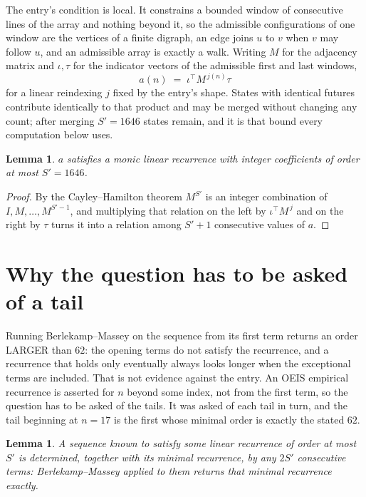 \documentclass[11pt,a4paper]{article}
\theoremstyle{plain}
\newtheorem{lemma}[theorem]{Lemma}
\theoremstyle{definition}
\begin{document}
The entry's condition is local. It constrains a bounded window of consecutive lines of the
array and nothing beyond it, so the admissible configurations of one window are the vertices of
a finite digraph, an edge joins $u$ to $v$ when $v$ may follow $u$, and an admissible array is
exactly a walk. Writing $M$ for the adjacency matrix and $\iota,\tau$ for the indicator vectors
of the admissible first and last windows,
\[
a(n)\;=\;\iota^{\!\top}M^{\,j(n)}\tau
\]
for a linear reindexing $j$ fixed by the entry's shape. States with identical futures
contribute identically to that product and may be merged without changing any count; after
merging $S'=1646$ states remain, and it is that bound every computation below uses.

\begin{lemma}\label{lem:cf}
$a$ satisfies a monic linear recurrence with integer coefficients of order at most $S'=1646$.
\end{lemma}

\begin{proof}
By the Cayley--Hamilton theorem $M^{S'}$ is an integer combination of $I,M,\dots,M^{S'-1}$,
and multiplying that relation on the left by $\iota^{\!\top}M^{\,j}$ and on the right by
$\tau$ turns it into a relation among $S'+1$ consecutive values of $a$.
\end{proof}

\section{Why the question has to be asked of a tail}

Running Berlekamp--Massey on the sequence from its first term returns an order LARGER than $62$: the opening terms do not satisfy the recurrence, and a recurrence that holds only eventually always looks longer when the exceptional terms are included. That is not evidence against the entry. An OEIS empirical recurrence is asserted for $n$ beyond some index, not from the first term, so the question has to be asked of the tails. It was asked of each tail in turn, and the tail beginning at $n=17$ is the first whose minimal order is exactly the stated $62$.

\begin{lemma}\label{lem:bm}
A sequence known to satisfy some linear recurrence of order at most $S'$ is determined,
together with its minimal recurrence, by any $2S'$ consecutive terms: Berlekamp--Massey applied
to them returns that minimal recurrence exactly.
\end{lemma}
\end{document}
